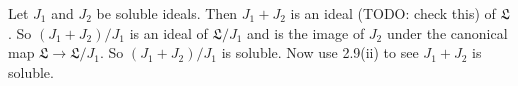Let $J_1$ and $J_2$ be soluble ideals. Then $J_1 + J_2$ is an ideal (TODO: check this)
of $\mathfrak{L}$. So $(J_1 + J_2)/J_1$ is an ideal of $\mathfrak{L}/J_1$ and is the
image of $J_2$ under the canonical map $\mathfrak{L}\to \mathfrak{L}/J_1$. So
$(J_1+J_2)/J_1$ is soluble. Now use 2.9(ii) to see $J_1 + J_2$ is soluble.
